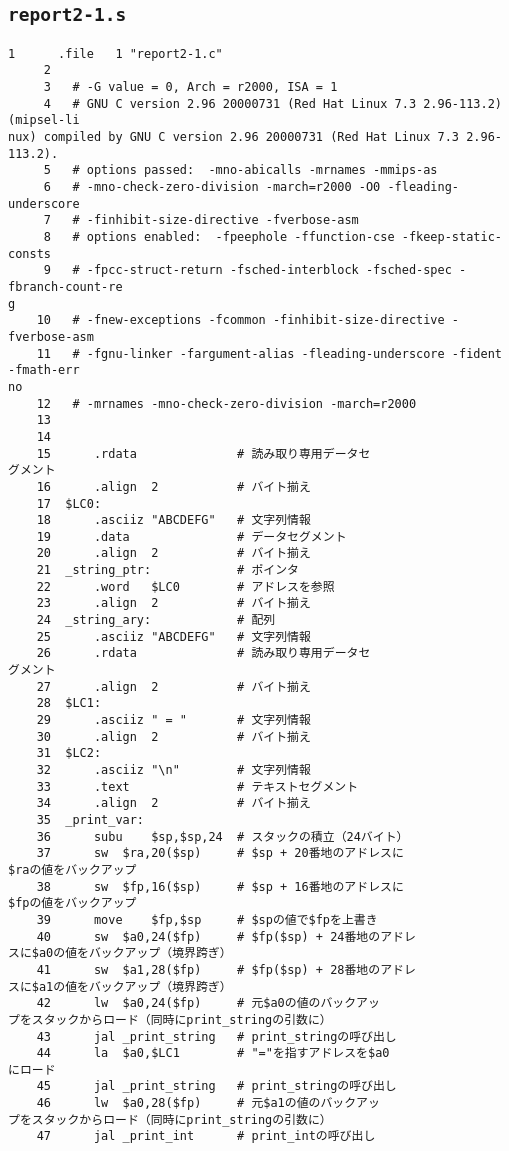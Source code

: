 \subsection{\texttt{report2-1.s}} \label{sec:report2-1.s}
\begin{Verbatim}[fontsize=\small, baselinestretch=0.8]
     1		.file	1 "report2-1.c"
     2	
     3	 # -G value = 0, Arch = r2000, ISA = 1
     4	 # GNU C version 2.96 20000731 (Red Hat Linux 7.3 2.96-113.2) (mipsel-li
nux) compiled by GNU C version 2.96 20000731 (Red Hat Linux 7.3 2.96-113.2).
     5	 # options passed:  -mno-abicalls -mrnames -mmips-as
     6	 # -mno-check-zero-division -march=r2000 -O0 -fleading-underscore
     7	 # -finhibit-size-directive -fverbose-asm
     8	 # options enabled:  -fpeephole -ffunction-cse -fkeep-static-consts
     9	 # -fpcc-struct-return -fsched-interblock -fsched-spec -fbranch-count-re
g
    10	 # -fnew-exceptions -fcommon -finhibit-size-directive -fverbose-asm
    11	 # -fgnu-linker -fargument-alias -fleading-underscore -fident -fmath-err
no
    12	 # -mrnames -mno-check-zero-division -march=r2000
    13	
    14	
    15		.rdata				# 読み取り専用データセ
グメント
    16		.align	2			# バイト揃え
    17	$LC0:
    18		.asciiz	"ABCDEFG"	# 文字列情報
    19		.data				# データセグメント
    20		.align	2			# バイト揃え
    21	_string_ptr:			# ポインタ
    22		.word	$LC0		# アドレスを参照
    23		.align	2			# バイト揃え
    24	_string_ary:			# 配列
    25		.asciiz	"ABCDEFG"	# 文字列情報
    26		.rdata				# 読み取り専用データセ
グメント
    27		.align	2			# バイト揃え
    28	$LC1:
    29		.asciiz	" = "		# 文字列情報
    30		.align	2			# バイト揃え
    31	$LC2:
    32		.asciiz	"\n"		# 文字列情報
    33		.text				# テキストセグメント
    34		.align	2			# バイト揃え
    35	_print_var:
    36		subu	$sp,$sp,24	# スタックの積立（24バイト）
    37		sw	$ra,20($sp)		# $sp + 20番地のアドレスに
$raの値をバックアップ
    38		sw	$fp,16($sp)		# $sp + 16番地のアドレスに
$fpの値をバックアップ
    39		move	$fp,$sp		# $spの値で$fpを上書き
    40		sw	$a0,24($fp)		# $fp($sp) + 24番地のアドレ
スに$a0の値をバックアップ（境界跨ぎ）
    41		sw	$a1,28($fp)		# $fp($sp) + 28番地のアドレ
スに$a1の値をバックアップ（境界跨ぎ）
    42		lw	$a0,24($fp)		# 元$a0の値のバックアッ
プをスタックからロード（同時にprint_stringの引数に）
    43		jal	_print_string	# print_stringの呼び出し
    44		la	$a0,$LC1		# "="を指すアドレスを$a0
にロード
    45		jal	_print_string	# print_stringの呼び出し
    46		lw	$a0,28($fp)		# 元$a1の値のバックアッ
プをスタックからロード（同時にprint_stringの引数に）
    47		jal	_print_int		# print_intの呼び出し

\end{Verbatim}

